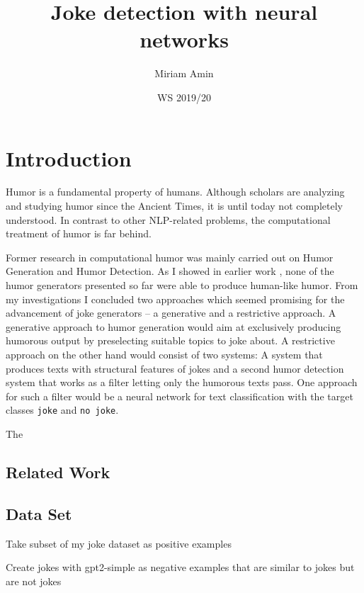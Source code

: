 \documentclass[12pt]{scrartcl}
\title{Joke detection with neural networks}
\author{Miriam Amin}
\date{WS 2019/20}
\begin{document}
\maketitle
\tableofcontents

\section{Introduction}
Humor is a fundamental property of humans. Although scholars are analyzing and studying humor since the Ancient Times, it is until today not completely understood. In contrast to other NLP-related problems, the computational treatment of humor is far behind. 

Former research in computational humor was mainly carried out on Humor Generation and Humor Detection. As I showed in earlier work \citep{aminComputationalHumorAutomatic2019}, none of the humor generators presented so far were able to produce human-like humor. From my investigations I concluded two approaches which seemed promising for the advancement of joke generators -- a generative and a restrictive approach. A generative approach to humor generation would aim at exclusively producing humorous output by preselecting suitable topics to joke about. A restrictive approach on the other hand would consist of two systems: A system that produces texts with structural features of jokes and a second humor detection system that works as a filter letting only the humorous texts pass.  
One approach for such a filter would be a neural network for text classification with the target classes \texttt{joke} and \texttt{no joke}.

The 

 
 \cite{aminComputationalHumorAutomatic2019}

\subsection{Related Work}
\subsection{Data Set}
Take subset of my joke dataset as positive examples


Create jokes with gpt2-simple as negative examples that are similar to jokes but are not jokes
\subsection{}



\end{document}
